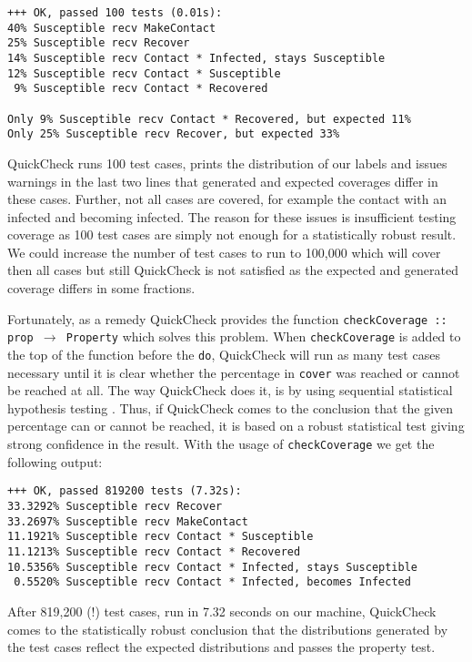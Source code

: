 \begin{footnotesize}
\begin{verbatim}
+++ OK, passed 100 tests (0.01s):
40% Susceptible recv MakeContact
25% Susceptible recv Recover
14% Susceptible recv Contact * Infected, stays Susceptible
12% Susceptible recv Contact * Susceptible
 9% Susceptible recv Contact * Recovered
    
Only 9% Susceptible recv Contact * Recovered, but expected 11%
Only 25% Susceptible recv Recover, but expected 33%
\end{verbatim}
\end{footnotesize}

QuickCheck runs 100 test cases, prints the distribution of our labels and issues warnings in the last two lines that generated and expected coverages differ in these cases. Further, not all cases are covered, for example the contact with an infected and becoming infected. The reason for these issues is insufficient testing coverage as 100 test cases are simply not enough for a statistically robust result. We could increase the number of test cases to run to 100,000 which will cover then all cases but still QuickCheck is not satisfied as the expected and generated coverage differs in some fractions. %

Fortunately, as a remedy QuickCheck provides the function \texttt{checkCoverage :: prop $\rightarrow$ Property} which solves this problem. When \texttt{checkCoverage} is added to the top of the function before the \texttt{do}, QuickCheck will run as many test cases necessary until it is clear whether the percentage in \texttt{cover} was reached or cannot be reached at all. The way QuickCheck does it, is by using sequential statistical hypothesis testing \cite{wald_sequential_1992}. Thus, if QuickCheck comes to the conclusion that the given percentage can or cannot be reached, it is based on a robust statistical test giving strong confidence in the result. With the usage of \texttt{checkCoverage} we get the following output:

\begin{footnotesize}
\begin{verbatim}
+++ OK, passed 819200 tests (7.32s):
33.3292% Susceptible recv Recover
33.2697% Susceptible recv MakeContact
11.1921% Susceptible recv Contact * Susceptible
11.1213% Susceptible recv Contact * Recovered
10.5356% Susceptible recv Contact * Infected, stays Susceptible
 0.5520% Susceptible recv Contact * Infected, becomes Infected
\end{verbatim}
\end{footnotesize}

After 819,200 (!) test cases, run in 7.32 seconds on our machine, QuickCheck comes to the statistically robust conclusion that the distributions generated by the test cases reflect the expected distributions and passes the property test.